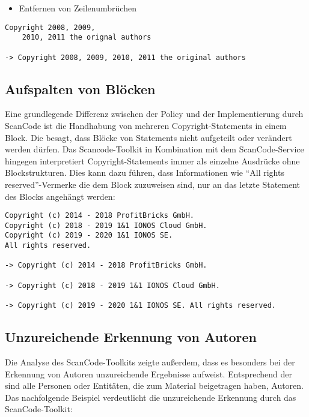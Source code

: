 \begin{itemize}
    \item Entfernen von Zeilenumbrüchen
\end{itemize}
\begin{lstlisting}[keepspaces=true]
Copyright 2008, 2009,
    2010, 2011 the orignal authors

-> Copyright 2008, 2009, 2010, 2011 the original authors
\end{lstlisting}


\subsection{Aufspalten von Blöcken}

Eine grundlegende Differenz zwischen der Policy und der Implementierung durch ScanCode ist die Handhabung von mehreren Copyright-Statements in einem Block.
Die  besagt, dass Blöcke von Statements nicht aufgeteilt oder verändert werden dürfen.
Das Scancode-Toolkit in Kombination mit dem ScanCode-Service hingegen interpretiert Copyright-Statements immer als einzelne Ausdrücke ohne Blockstrukturen.
Dies kann dazu führen, dass Informationen wie \enquote{All rights reserved}-Vermerke die dem Block zuzuweisen sind, nur an das letzte Statement des Blocks angehängt werden:

\begin{lstlisting}[keepspaces=true]
Copyright (c) 2014 - 2018 ProfitBricks GmbH.
Copyright (c) 2018 - 2019 1&1 IONOS Cloud GmbH.
Copyright (c) 2019 - 2020 1&1 IONOS SE.
All rights reserved.

-> Copyright (c) 2014 - 2018 ProfitBricks GmbH.

-> Copyright (c) 2018 - 2019 1&1 IONOS Cloud GmbH.

-> Copyright (c) 2019 - 2020 1&1 IONOS SE. All rights reserved.
\end{lstlisting}


\subsection{Unzureichende Erkennung von Autoren}

Die Analyse des ScanCode-Toolkits zeigte außerdem, dass es besonders bei der Erkennung von Autoren unzureichende Ergebnisse aufweist.
Entsprechend der  sind alle Personen oder Entitäten, die zum Material beigetragen haben, Autoren.
Das nachfolgende Beispiel verdeutlicht die unzureichende Erkennung durch das ScanCode-Toolkit:

